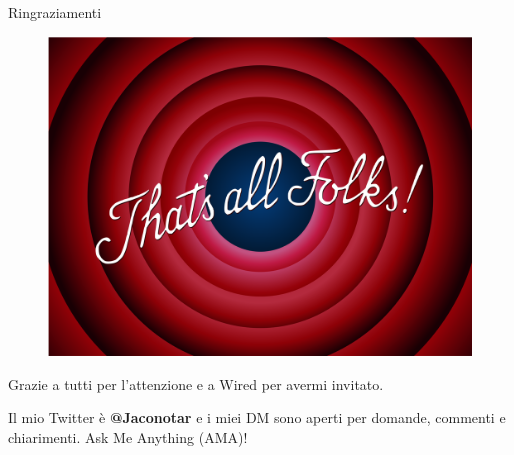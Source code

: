 \documentclass[12pt]{beamer}
\begin{document}
  \begin{frame}{Ringraziamenti}
    \begin{figure}
      \centering
      \includegraphics[width=0.5\linewidth]{tex/img/folks}
    \end{figure}

    Grazie a tutti per l'attenzione e a Wired per avermi invitato.

    \vspace{0.25cm}

    Il mio Twitter è \textbf{@Jaconotar} e i miei DM sono aperti per domande,
    commenti e chiarimenti. Ask Me Anything (AMA)!
  \end{frame}
\end{document}
